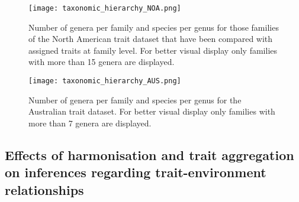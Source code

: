 \documentclass[../Draft_harmonization_paper.tex]{subfiles}
\begin{document}
\begin{figure}[H]
    \centering
    \texttt{[image: taxonomic\_hierarchy\_NOA.png]}
    \caption{Number of genera per family and species per genus for those families of the North American trait dataset that have been compared with assigned traits at family level. For better visual display only families with more than 15 genera are displayed.}
    \label{fig:tax_hierarchy_NOA}
\end{figure}

\begin{figure}[H]
    \centering
    \texttt{[image: taxonomic\_hierarchy\_AUS.png]}
    \caption{Number of genera per family and species per genus for the Australian trait dataset. For better visual display only families with more than 7 genera are displayed.}
    \label{fig:tax_hierarchy_AUS}
\end{figure}

\newpage

\subsection*{Effects of harmonisation and trait aggregation on inferences regarding trait-environment relationships}
\end{document}
